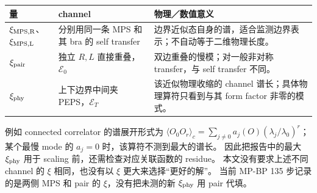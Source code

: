 \documentclass[11pt]{article}
\begin{document}
\begin{center}\small
\begin{tabular}{P{30mm}P{56mm}P{62mm}}
\toprule
量 & channel & 物理／数值意义 \\
\midrule
$\xi_{\rm MPS,R}$、$\xi_{\rm MPS,L}$ & 分别用同一条 MPS 和其 bra 的 self transfer & 边界近似态自身的谱，适合监测边界表示；不自动等于二维物理长度。\\
$\xi_{\rm pair}$ & 独立 $R,L$ 直接重叠，$\mathcal E_0$ & 双边重叠的慢模；对一般非对称 transfer，与 self transfer 不同。\\
$\xi_{\rm phy}$ & 上下边界中间夹 PEPS，$\mathcal E_T$ & 该近似物理收缩的 channel 谱长；具体物理算符只看到与其 form factor 非零的模式。\\
\bottomrule
\end{tabular}
\end{center}

例如 connected correlator 的谱展开形式为
$\langle O_0O_r\rangle_c=\sum_{j\ne0}a_j(O)(\lambda_j/\lambda_0)^r$；
某个最慢 mode 的 $a_j=0$ 时，该算符不测到最大的谱长。
因此把报告中的最大 $\xi_{\rm phy}$ 用于 scaling 前，还需检查对应关联函数的 residue。
本文没有要求上述不同 channel 的 $\xi$ 相同，也没有以 $\xi$ 更大来选择“更好的解”。
当前 MP-BP 135 步记录的是两侧 MPS 和 pair 的 $\xi$，没有把未测的新 $\xi_{\rm phy}$ 用 pair 代填。
\end{document}
